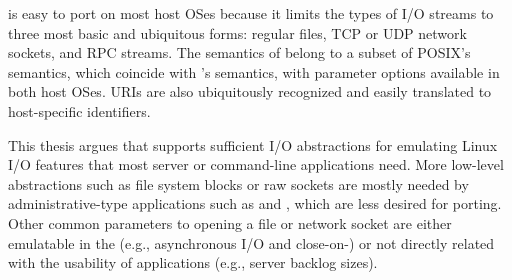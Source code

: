 



 is easy to port on most host OSes because it limits the types of I/O streams
to three most basic and ubiquitous forms: regular files, TCP or UDP network sockets, and RPC streams.
The semantics of  belong to a subset of POSIX's  semantics, which coincide with \win{}'s  semantics, with parameter options available in both host OSes.
URIs are also ubiquitously recognized and easily translated
to host-specific identifiers.

This thesis argues that  supports sufficient I/O abstractions
for emulating Linux I/O features that most server or command-line applications need.
More low-level abstractions such as file system blocks or raw sockets are mostly needed by administrative-type applications such as  and , which are less desired for porting.
Other common parameters to opening a file or network socket
are either emulatable in the \libos{} (e.g., asynchronous I/O and close-on-) or not directly related with the usability of applications (e.g., server backlog sizes).




